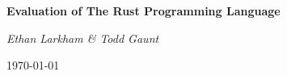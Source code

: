 \begin{center}
	{\huge\bfseries Evaluation of The Rust Programming Language\par}
	\vspace{1cm}
  {\Large\itshape Ethan Larkham \& Todd Gaunt\par}
	\vspace{0.5cm}
	{\large\today\par}
\end{center}

